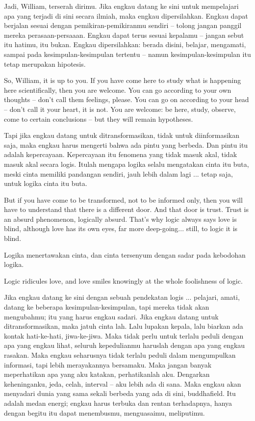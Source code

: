 \bahasa
Jadi, William, terserah dirimu. Jika engkau datang ke sini untuk mempelajari apa yang terjadi di sini secara ilmiah, maka engkau dipersilahkan. Engkau dapat berjalan sesuai dengan pemikiran-pemikiranmu sendiri -- tolong jangan panggil mereka perasaan-persaaan. Engkau dapat terus sesuai kepalamu -- jangan sebut itu hatimu, itu bukan. Engkau dipersilahkan: berada disini, belajar, mengamati, sampai pada kesimpulan-kesimpulan tertentu -- namun kesimpulan-kesimpulan itu tetap merupakan hipotesis.

\english
So, William, it is up to you. If you have come here to study what is happening here scientifically, then you are welcome. You can go according to your own thoughts -- don't call them feelings, please. You can go on according to your head -- don't call it your heart, it is not. You are welcome: be here, study, observe, come to certain conclusions -- but they will remain hypotheses.

\bahasa
Tapi jika engkau datang untuk ditransformasikan, tidak untuk diinformasikan saja, maka engkau harus mengerti bahwa ada pintu yang berbeda. Dan pintu itu adalah kepercayaan. Kepercayaan itu fenomena yang tidak masuk akal, tidak masuk akal secara logis. Itulah mengapa logika selalu mengatakan cinta itu buta, meski cinta memiliki pandangan sendiri, jauh lebih dalam lagi ... tetap saja, untuk logika cinta itu buta.

\english
But if you have come to be transformed, not to be informed only, then you will have to understand that there is a different door. And that door is trust. Trust is an absurd phenomenon, logically absurd. That's why logic always says love is blind, although love has its own eyes, far more deep-going... still, to logic it is blind.

\bahasa
Logika menertawakan cinta, dan cinta tersenyum dengan sadar pada kebodohan logika.

\english
Logic ridicules love, and love smiles knowingly at the whole foolishness of logic.

\bahasa
Jika engkau datang ke sini dengan sebuah pendekatan logis ... pelajari, amati, datang ke beberapa kesimpulan-kesimpulan, tapi mereka tidak akan mengubahmu; itu yang harus engkau sadari. Jika engkau datang untuk ditransformasikan, maka jatuh cinta lah. Lalu lupakan kepala, lalu biarkan ada kontak hati-ke-hati, jiwa-ke-jiwa. Maka tidak perlu untuk terlalu peduli dengan apa yang engkau lihat, seluruh kepedulianmu haruslah dengan apa yang engkau rasakan. Maka engkau seharusnya tidak terlalu peduli dalam mengumpulkan informasi, tapi lebih merayakannya bersamaku. Maka jangan banyak meperhatikan apa yang aku katakan, perhatikanlah aku. Dengarkan keheninganku, jeda, celah, interval -- aku lebih ada di sana. Maka engkau akan menyadari dunia yang sama sekali berbeda yang ada di sini, buddhafield. Itu adalah medan energi; engkau harus terbuka dan rentan terhadapnya, hanya dengan begitu itu dapat menembusmu, menguasaimu, meliputimu.

